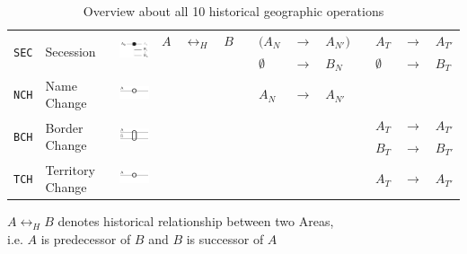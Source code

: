 \begin{table}[!h]
\begin{center}
\begin{tabular}{m{0.65cm} m{2.5cm} m{2.2cm}
                m{0.35cm} m{0.35cm} m{0.35cm} m{0.01cm}
                m{0.35cm} m{0.3cm} m{0.35cm} m{0.01cm}
                m{0.35cm} m{0.3cm} m{0.88cm}}
  \midrule[0.01em]
  \multirow{2}{*}{\texttt{SEC}} &
  \multirow{2}{*}{Secession} &
  \multirow{2}{*}{\includegraphics{graphics/concept/operations/SEC}} &
  $ A $     & $ \leftrightarrow_H $     & $ B $ & &
  $ (A_N $  & $ \rightarrow $           & $ A_{N'}) $ & &
  $ A_T $   & $ \rightarrow $           & $ A_{T'} $ \\
  & & &
  & & & &
  $ \emptyset $ & $ \rightarrow $ & $ B_N $ & &
  $ \emptyset $ & $ \rightarrow $ & $ B_T $ \footnotemark \\

  \midrule[0.07em]
  \multirow{1}{*}{\texttt{NCH}} &
  \multirow{1}{*}{Name Change} &
  \multirow{1}{*}{\includegraphics{graphics/concept/operations/NCH_TCH}} &
  & & & &
  $ A_N $ & $ \rightarrow $ & $ A_{N'} $ & &
  & & \\

  \midrule[0.01em]
  \multirow{2}{*}{\texttt{BCH}} &
  \multirow{2}{*}{Border Change} &
  \multirow{2}{*}{\includegraphics{graphics/concept/operations/BCH}} &
  & & & &
  & & & &
  $ A_T $ & $ \rightarrow $ & $ A_{T'} $ \\
  & & &
  & & & &
  & & & &
  $ B_T $ & $ \rightarrow $ & $ B_{T'} $ \footnotemark \\

  \midrule[0.01em]
  \multirow{1}{*}{\texttt{TCH}} &
  \multirow{1}{*}{Territory Change} &
  \multirow{1}{*}{\includegraphics{graphics/concept/operations/NCH_TCH}} &
  & & & &
  & & & &
  $ A_T $ & $ \rightarrow $ & $ A_{T'} $ \\

  \bottomrule
\end{tabular}
\caption{Overview about all 10 historical geographic operations}
\small{$A \leftrightarrow_H B$ denotes historical relationship between two Areas, \\ i.e. $A$ is predecessor of $B$ and $B$ is successor of $A$}
\label{tab:historical_geographic_operations}
\end{center}
\end{table}


